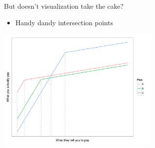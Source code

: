 \documentclass[sans,aspectratio=169,presentation,bigger,fleqn]{beamer}
\begin{document}
\begin{frame}[label=sec-14]{But doesn't visualization take the cake?}
\begin{itemize}
\item Handy dandy intersection points
\end{itemize}

\begin{center}
\includegraphics[height=6cm]{./img/ins-intersections.pdf}
\end{center}
\end{frame}
\end{document}
